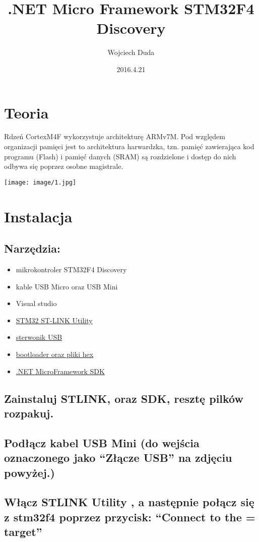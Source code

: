 \documentclass{article}
\title{.NET Micro Framework
STM32F4 Discovery}
\date{2016.4.21}
\author{Wojciech Duda}
\begin{document}
 
\maketitle 
{} 
\newpage
{}
\section{Teoria}
Rdzeń CortexM4F wykorzystuje architekturę ARMv7M. Pod względem organizacji pamięci jest to architektura harwardzka, tzn. pamięć zawierająca kod programu (Flash) i pamięć danych (SRAM) są rozdzielone i dostęp do nich odbywa się poprzez osobne magistrale.

\texttt{[image: image/1.jpg]}
\section{Instalacja}
\subsection{Narzędzia:}
\begin{itemize}
\item mikrokontroler STM32F4 Discovery
\item kable USB Micro oraz USB Mini
\item Visual studio
\item \href{http://www.st.com/content/st_com/en/products/embedded-software/development-tool-software/stsw-link004.html}{STM32 ST-LINK Utility}
\item \href{www.codeplex.com/Download?ProjectName=netmf4stm32&DownloadId=471395}{sterwonik USB}
\item \href{www.codeplex.com/Download?ProjectName=netmf4stm32&DownloadId=471396}{bootloader oraz pliki hex}
\item \href {netmf.codeplex.com/releases/view/91594}{.NET MicroFramework SDK}
\end{itemize}
\subsection{Zainstaluj STLINK, oraz SDK, resztę pilków rozpakuj.}
\subsection{Podłącz kabel USB Mini (do wejścia oznaczonego jako “Złącze USB” na zdjęciu powyżej.)}
\subsection{Włącz STLINK Utility , a następnie połącz się z stm32f4 poprzez przycisk: “Connect to the = target”}
\end{document}

